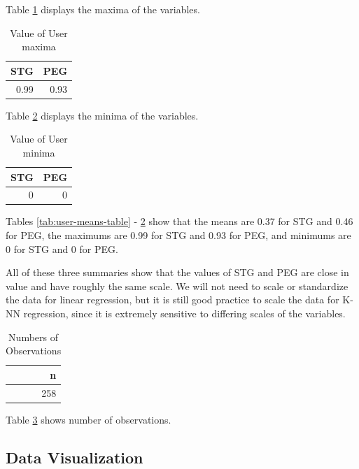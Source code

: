 \documentclass[
]{article}
\begin{document}
Table \ref{tab:user-maxima-table} displays the maxima of the variables.

\begin{table}

\caption{\label{tab:user-maxima-table}Value of User maxima}
\centering
\begin{tabular}[t]{r|r}
\hline
STG & PEG\\
\hline
0.99 & 0.93\\
\hline
\end{tabular}
\end{table}

Table \ref{tab:user-minima-table} displays the minima of the variables.

\begin{table}

\caption{\label{tab:user-minima-table}Value of User minima}
\centering
\begin{tabular}[t]{r|r}
\hline
STG & PEG\\
\hline
0 & 0\\
\hline
\end{tabular}
\end{table}

Tables \ref{tab:user-means-table} - \ref{tab:user-minima-table} show that the means are 0.37 for STG and 0.46 for PEG, the maximums are 0.99 for STG and 0.93 for PEG, and minimums are 0 for STG and 0 for PEG.

All of these three summaries show that the values of STG and PEG are close in value and have roughly the same scale. We will not need to scale or standardize the data for linear regression, but it is still good practice to scale the data for K-NN regression, since it is extremely sensitive to differing scales of the variables.

\begin{table}

\caption{\label{tab:user-observations-table}Numbers of Observations}
\centering
\begin{tabular}[t]{r}
\hline
n\\
\hline
258\\
\hline
\end{tabular}
\end{table}

Table \ref{tab:user-observations-table} shows number of observations.

\hypertarget{data-visualization}{%
\subsection{Data Visualization}\label{data-visualization}}
\end{document}
